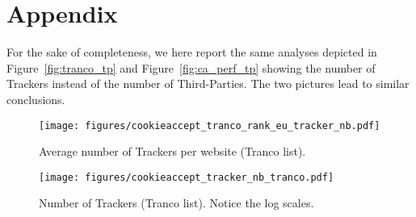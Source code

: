 \newpage

\section*{Appendix}
\label{sec:appendix}

For the sake of completeness, we here report the same analyses depicted in Figure~\ref{fig:tranco_tp} and Figure~\ref{fig:ca_perf_tp} showing the number of Trackers instead of the number of Third-Parties. The two pictures lead to similar conclusions.

\begin{figure}[!h]
    \centering
    \texttt{[image: figures/cookieaccept\_tranco\_rank\_eu\_tracker\_nb.pdf]}
    \caption{Average number of Trackers per website (Tranco list).}
    \label{fig:tranco_trackers}
\end{figure}


\begin{figure}[!h]
    \centering
    \texttt{[image: figures/cookieaccept\_tracker\_nb\_tranco.pdf]}
    \caption{Number of Trackers (Tranco list). Notice the log scales.}
    \label{fig:ca_perf_tracker}
\end{figure}